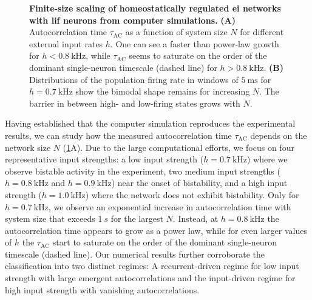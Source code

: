 
\begin{figure}[t]
	\centering
	\caption{%
		\textbf{Finite-size scaling of homeostatically regulated \gls{ei} networks with \gls{lif} neurons from computer simulations.}
		\textbf{(A)} Autocorrelation time $\tau_\mathrm{AC}$ as a function of system size $N$ for different external input rates $h$.
        One can see a faster than power-law growth for $h<\SI{0.8}{\kilo\hertz}$, while $\tau_\mathrm{AC}$ seems to saturate on the order of the dominant single-neuron timescale (dashed line) for $h>\SI{0.8}{\kilo\hertz}$.
		\textbf{(B)} Distributions of the population firing rate in windows of $\SI{5}{\milli\second}$ for $h=\SI{0.7}{\kilo\hertz}$ show the bimodal shape remains for increasing $N$.
		The barrier in between high- and low-firing states grows with $N$.
    	}
	\label{fig:sim}
\end{figure}

Having established that the computer simulation reproduces the experimental results, we can study how the measured autocorrelation time $\tau_\mathrm{AC}$ depends on the network size $N$ (\cref{fig:sim}A).
Due to the large computational efforts, we focus on four representative input strengths: a low input strength ($h=\SI{0.7}{\kilo\hertz}$) where we observe bistable activity in the experiment, two medium input strengths ($h=\SI{0.8}{\kilo\hertz}$ and $h=\SI{0.9}{\kilo\hertz}$) near the onset of bistability, and a high input strength ($h=\SI{1.0}{\kilo\hertz}$) where the network does not exhibit bistability.
Only for $h=\SI{0.7}{\kilo\hertz}$, we observe an exponential increase in autocorrelation time with system size that exceeds $\SI{1}{s}$ for the largest $N$.
Instead, at $h=\SI{0.8}{\kilo\hertz}$ the autocorrelation time appears to grow as a power law, while for even larger values of $h$ the $\tau_\mathrm{AC}$ start to saturate on the order of the dominant single-neuron timescale (dashed line).
Our numerical results further corroborate the classification into two distinct regimes: A recurrent-driven regime for low input strength with large emergent autocorrelations and the input-driven regime for high input strength with vanishing autocorrelations.

